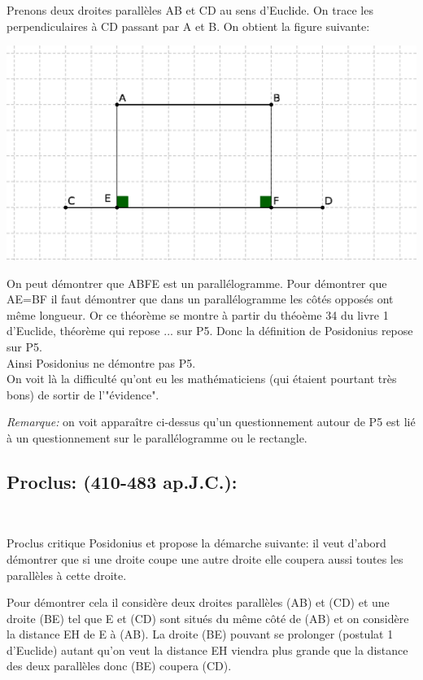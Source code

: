 \documentclass[a4paper, 12pt, twoside]{book}
\begin{document}
   Prenons deux droites parallèles AB et CD au sens d'Euclide. On trace les perpendiculaires à  CD passant par A et B. On obtient la figure suivante:\
   
   \includegraphics[scale=0.7]{figures/posid.eps}     
  
 On peut démontrer que ABFE est un parallélogramme. Pour démontrer que AE=BF il faut démontrer que dans un parallélogramme les côtés opposés ont même longueur. Or ce théorème se montre à partir du théoème 34 du livre 1 d'Euclide, théorème qui repose ... sur P5. Donc la définition de Posidonius repose sur P5.\\
  
  
   
   
   
   
  
   Ainsi Posidonius ne démontre pas P5.\\
   
   On voit là la difficulté qu'ont eu les mathématiciens (qui étaient pourtant très bons) de sortir de l'"évidence".\
   
   \textit{Remarque:} on voit apparaître ci-dessus qu'un questionnement autour de P5 est lié à un questionnement sur le parallélogramme ou le rectangle. 

  \subsection{Proclus: (410-483 ap.J.C.):}\


Proclus critique Posidonius et propose la démarche suivante: il veut d'abord démontrer que si une droite coupe une autre droite elle coupera aussi toutes les parallèles à cette droite.\


     Pour démontrer cela il considère deux droites parallèles (AB) et (CD) et une droite (BE) tel que E et (CD) sont situés du même  côté  de (AB) et on considère la distance EH de E à (AB). La droite (BE) pouvant se prolonger (postulat 1 d'Euclide) autant qu'on veut la distance EH viendra plus grande que la distance des deux parallèles donc (BE) coupera (CD).
\end{document}
